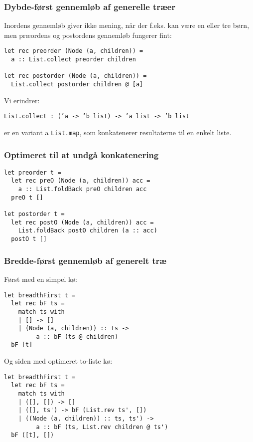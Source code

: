 \documentclass{beamer}
\begin{document}
\begin{frame}[fragile=singleslide]
\frametitle{Dybde-først gennemløb af generelle træer}

Inordens gennemløb giver ikke mening, når der f.eks. kan være en eller
tre børn, men præordens og postordens gennemløb fungerer fint:

\renewcommand{\baselinestretch}{0.9}
\begin{verbatim}
let rec preorder (Node (a, children)) =
  a :: List.collect preorder children

let rec postorder (Node (a, children)) =
  List.collect postorder children @ [a]
\end{verbatim}

Vi erindrer:

\texttt{List.collect : ('a -> 'b list) -> 'a list -> 'b list}

er en variant a \texttt{List.map}, som konkatenerer
resultaterne til en enkelt liste.

\end{frame}

\begin{frame}[fragile=singleslide]
\frametitle{Optimeret til at undgå konkatenering}

\renewcommand{\baselinestretch}{0.9}
\begin{verbatim}
let preorder t =
  let rec preO (Node (a, children)) acc =
    a :: List.foldBack preO children acc
  preO t []

let postorder t =
  let rec postO (Node (a, children)) acc =
    List.foldBack postO children (a :: acc)
  postO t []
\end{verbatim}

\end{frame}

\begin{frame}[fragile=singleslide]
\frametitle{Bredde-først gennemløb af generelt træ}

Først med en simpel kø:

\renewcommand{\baselinestretch}{0.9}
\begin{verbatim}
let breadthFirst t =
  let rec bF ts =
    match ts with
    | [] -> []
    | (Node (a, children)) :: ts ->
         a :: bF (ts @ children)
  bF [t]
\end{verbatim}

Og siden med optimeret to-liste kø:

\renewcommand{\baselinestretch}{0.9}
\begin{verbatim}
let breadthFirst t =
  let rec bF ts =
    match ts with
    | ([], []) -> []
    | ([], ts') -> bF (List.rev ts', [])
    | ((Node (a, children)) :: ts, ts') ->
         a :: bF (ts, List.rev children @ ts')
  bF ([t], [])
\end{verbatim}

\end{frame}
\end{document}

